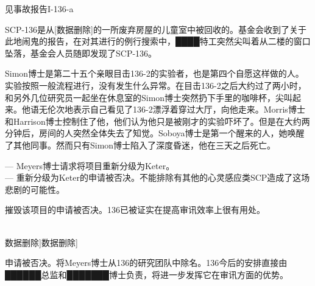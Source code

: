 见事故报告I-136-a


SCP-136是从{[}数据删除]的一所废弃房屋的儿童室中被回收的。基金会收到了关于此地闹鬼的报告，在对其进行的例行搜索中，████特工突然尖叫着从二楼的窗口坠落，基金会人员随即发现了SCP-136。



Simon博士是第二十五个亲眼目击136-2的实验者，也是第四个自愿这样做的人。实验按照一般流程进行，没有发生什么异常。在目击136-2之后大约过了两小时，和另外几位研究员一起坐在休息室的Simon博士突然扔下手里的咖啡杯，尖叫起来。他语无伦次地表示自己看见了136-2漂浮着穿过大厅，向他走来。Morris博士和Harrison博士控制住了他，他们认为他只是被刚才的实验吓坏了。但是在大约两分钟后，房间的人突然全体失去了知觉。Soboya博士是第一个醒来的人，她唤醒了其他同事。然而只有Simon博士陷入了深度昏迷，他在三天之后死亡。

— Meyers博士请求将项目重新分级为Keter。\\
— 重新分级为Keter的申请被否决。不能排除有其他的心灵感应类SCP造成了这场悲剧的可能性。



摧毁该项目的申请被否决。136已被证实在提高审讯效率上很有用处。

\\
\ii{这事已经失控了。你们都看见发生了什么，真见鬼，方圆一千码之内所有的人都不会忘了}{[}数据删除]\ii{，屋里的那个D级人员不见了，没人知道他是怎么消失的。至少我们应该在把D级人员送进去之前对他们进行更严格的筛选，我们本来早该发现他是}{[}数据删除]

申请被否决。将Meyers博士从136的研究团队中除名。136今后的安排直接由██████总监和███████博士负责，将进一步发挥它在审讯方面的优势。
